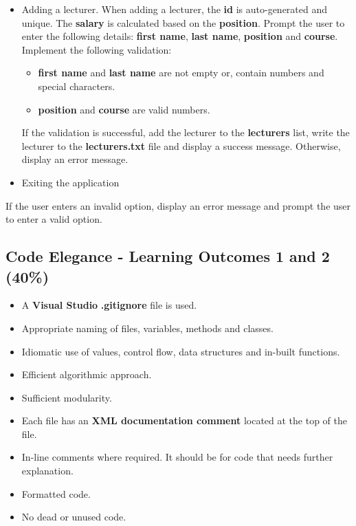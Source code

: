 \documentclass{article}
\begin{document}
\begin{itemize}
\begin{itemize}
\begin{itemize}
\begin{itemize}
            \end{itemize}
            \item Adding a lecturer. When adding a lecturer, the \textbf{id} is auto-generated and unique. The \textbf{salary} is calculated based on the \textbf{position}. Prompt the user to enter the following details: \textbf{first name}, \textbf{last name}, \textbf{position} and \textbf{course}. Implement the following validation:
            \begin{itemize}
                \item \textbf{first name} and \textbf{last name} are not empty or, contain numbers and special characters.
                \item \textbf{position} and \textbf{course} are valid numbers.
            \end{itemize}
            If the validation is successful, add the lecturer to the \textbf{lecturers} list, write the lecturer to the \textbf{lecturers.txt} file and display a success message. Otherwise, display an error message.
            \item Exiting the application
        \end{itemize} 
        If the user enters an invalid option, display an error message and prompt the user to enter a valid option.
    \end{itemize}
\end{itemize}

\subsection*{Code Elegance - Learning Outcomes 1 and 2 (40\%)}
\begin{itemize}
    \item A \textbf{Visual Studio} \textbf{.gitignore} file is used. 
    \item Appropriate naming of files, variables, methods and classes.
    \item Idiomatic use of values, control flow, data structures and in-built functions.
    \item Efficient algorithmic approach.
    \item Sufficient modularity.
    \item Each file has an \textbf{XML documentation comment} located at the top of the file.
    \item In-line comments where required. It should be for code that needs further explanation.
    \item Formatted code.
    \item No dead or unused code.
\end{itemize}
\end{document}
